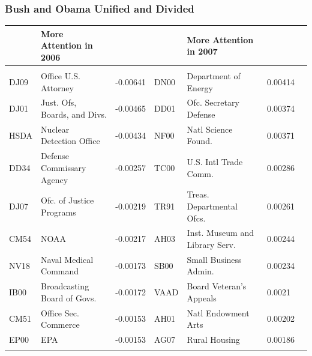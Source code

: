 \documentclass{beamer}
\begin{document}
\begin{frame}
\frametitle{Bush and Obama Unified and Divided}

\begin{table}[!htbp] \centering 
\tiny
\begin{tabular}{@{\extracolsep{5pt}} lllllll} 
\\[-1.8ex]\hline 
& More Attention in 2006 &&& More Attention in 2007 & \\
\hline \\[-1.8ex] 
DJ09 & Office U.S. Attorney & -0.00641          & DN00 & Department of Energy &  0.00414 \\ 
DJ01 & Just. Ofs, Boards, and Divs. & -0.00465& DD01 & Ofc. Secretary Defense& 0.00374 \\ 
HSDA & Nuclear Detection Office& -0.00434     & NF00 & Natl Science Found.& 0.00371 \\ 
DD34 & Defense Commissary Agency & -0.00257   & TC00 & U.S. Intl Trade Comm. & 0.00286 \\ 
DJ07 & Ofc. of Justice Programs & -0.00219    & TR91 & Treas. Departmental Ofcs. & 0.00261 \\ 
CM54 & NOAA &  -0.00217                       & AH03 & Inst. Museum and Library Serv.& 0.00244 \\ 
NV18 & Naval Medical Command & -0.00173       & SB00 & Small Business Admin. & 0.00234 \\ 
IB00 & Broadcasting Board of Govs. & -0.00172 & VAAD & Board Veteran's Appeals& 0.0021 \\ 
CM51 & Office Sec. Commerce &  -0.00153       & AH01 & Natl Endowment Arts & 0.00202 \\ 
EP00 & EPA & -0.00153                         & AG07 & Rural Housing & 0.00186 \\ 
\hline \\[-1.8ex] 
\end{tabular} 
\end{table}


\end{frame}
\end{document}
